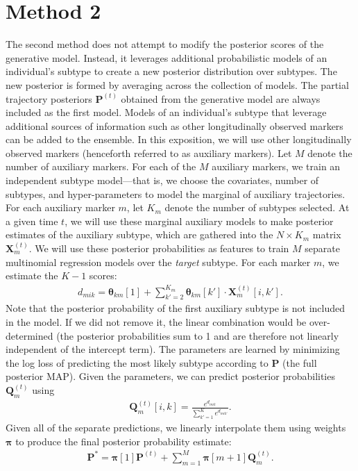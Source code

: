 \documentclass[12pt]{article}
\newcommand{\psup}[1]{^{(#1)}}
\begin{document}
\section{Method 2}

The second method does not attempt to modify the posterior scores of the generative model. Instead, it leverages additional probabilistic models of an individual's subtype to create a new posterior distribution over subtypes. The new posterior is formed by averaging across the collection of models. The partial trajectory posteriors $\bm{P}\psup{t}$ obtained from the generative model are always included as the first model. Models of an individual's subtype that leverage additional sources of information such as other longitudinally observed markers can be added to the ensemble. In this exposition, we will use other longitudinally observed markers (henceforth referred to as auxiliary markers). Let $M$ denote the number of auxiliary markers. For each of the $M$ auxiliary markers, we train an independent subtype model---that is, we choose the covariates, number of subtypes, and hyper-parameters to model the marginal of auxiliary trajectories. For each auxiliary marker $m$, let $K_m$ denote the number of subtypes selected. At a given time $t$, we will use these marginal auxiliary models to make posterior estimates of the auxiliary subtype, which are gathered into the $N \times K_m$ matrix $\bm{X}_m\psup{t}$. We will use these posterior probabilities as features to train $M$ separate multinomial regression models over the \emph{target} subtype. For each marker $m$, we estimate the $K - 1$ scores:
\begin{align}
d_{mik} = \bm{\theta}_{km}[1] + \sum_{k'=2}^{K_m} \bm{\theta}_{km}[k'] \cdot \bm{X}_m\psup{t}[i,k'].
\end{align}
Note that the posterior probability of the first auxiliary subtype is not included in the model. If we did not remove it, the linear combination would be over-determined (the posterior probabilities sum to 1 and are therefore not linearly independent of the intercept term). The parameters are learned by minimizing the log loss of predicting the most likely subtype according to $\bm{P}$ (the full posterior MAP). Given the parameters, we can predict posterior probabilities $\bm{Q}_m\psup{t}$ using
\begin{align}
\bm{Q}_m\psup{t}[i,k] = \frac{e^{d_{mik}}}{\sum_{k'=1}^K e^{d_{mik'}}}.
\end{align}
Given all of the separate predictions, we linearly interpolate them using weights $\bm{\pi}$ to produce the final posterior probability estimate:
\begin{align}
\bm{P}^* = \bm{\pi}[1] \bm{P}\psup{t} + \sum_{m=1}^M \bm{\pi}[m+1] \bm{Q}_m\psup{t}.
\end{align}
\end{document}
